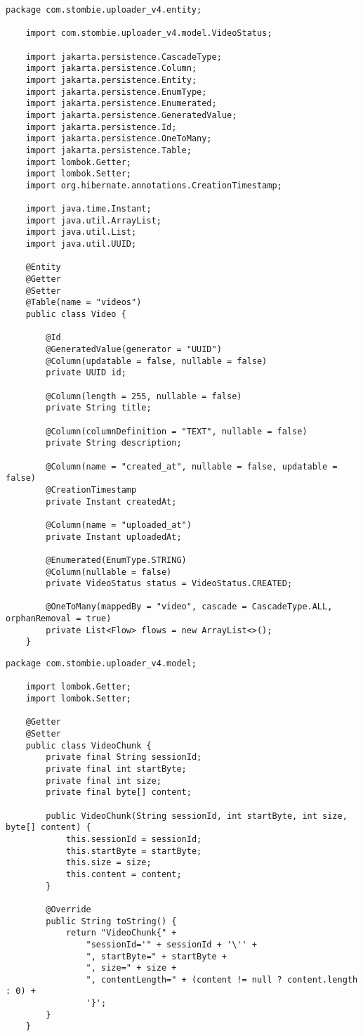 \begin{lstlisting}[caption={Video.java}]
	package com.stombie.uploader_v4.entity;
	
	import com.stombie.uploader_v4.model.VideoStatus;
	
	import jakarta.persistence.CascadeType;
	import jakarta.persistence.Column;
	import jakarta.persistence.Entity;
	import jakarta.persistence.EnumType;
	import jakarta.persistence.Enumerated;
	import jakarta.persistence.GeneratedValue;
	import jakarta.persistence.Id;
	import jakarta.persistence.OneToMany;
	import jakarta.persistence.Table;
	import lombok.Getter;
	import lombok.Setter;
	import org.hibernate.annotations.CreationTimestamp;
	
	import java.time.Instant;
	import java.util.ArrayList;
	import java.util.List;
	import java.util.UUID;
	
	@Entity
	@Getter
	@Setter
	@Table(name = "videos")
	public class Video {
		
		@Id
		@GeneratedValue(generator = "UUID")
		@Column(updatable = false, nullable = false)
		private UUID id;
		
		@Column(length = 255, nullable = false)
		private String title;
		
		@Column(columnDefinition = "TEXT", nullable = false)
		private String description;
		
		@Column(name = "created_at", nullable = false, updatable = false)
		@CreationTimestamp
		private Instant createdAt;
		
		@Column(name = "uploaded_at")
		private Instant uploadedAt;
		
		@Enumerated(EnumType.STRING)
		@Column(nullable = false)
		private VideoStatus status = VideoStatus.CREATED;
		
		@OneToMany(mappedBy = "video", cascade = CascadeType.ALL, orphanRemoval = true)
		private List<Flow> flows = new ArrayList<>();
	}
\end{lstlisting}

\begin{lstlisting}[caption={VideoChunk.java}]
	package com.stombie.uploader_v4.model;
	
	import lombok.Getter;
	import lombok.Setter;
	
	@Getter
	@Setter
	public class VideoChunk {
		private final String sessionId;
		private final int startByte;
		private final int size;
		private final byte[] content;
		
		public VideoChunk(String sessionId, int startByte, int size, byte[] content) {
			this.sessionId = sessionId;
			this.startByte = startByte;
			this.size = size;
			this.content = content;
		}
		
		@Override
		public String toString() {
			return "VideoChunk{" +
				"sessionId='" + sessionId + '\'' +
				", startByte=" + startByte +
				", size=" + size +
				", contentLength=" + (content != null ? content.length : 0) +
				'}';
		}
	}
\end{lstlisting}

